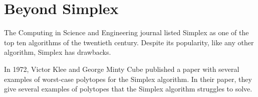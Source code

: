 \section*{Beyond Simplex}
The Computing in Science and Engineering journal listed Simplex as one of the top ten algorithms of the twentieth century.\cite{Nash2000}
Despite its popularity, like any other algorithm, Simplex has drawbacks.

In 1972, Victor Klee and George Minty Cube published a paper with several examples of worst-case polytopes for the Simplex algorithm.\cite{Klee1972}
In their paper, they give several examples of polytopes that the Simplex algorithm struggles to solve.



